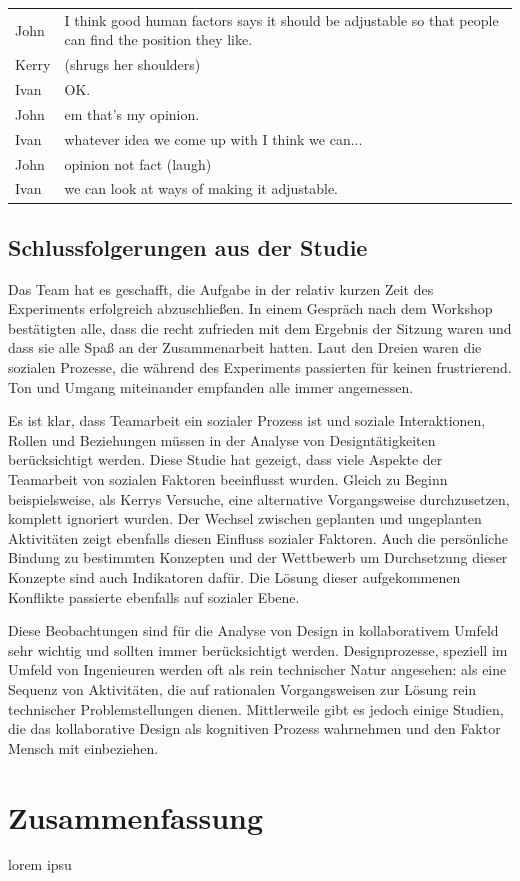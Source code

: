 \begin{extract}[Kerry und Ivan finden Johns Einwand nicht so gut.]
	{
		\myfloatalign
		\begin{tabularx}{\textwidth}{p{1cm}X}
    		John & I think good human factors says it should be adjustable so that people can find the position they like. \\
			Kerry & (shrugs her shoulders) \\
			Ivan & OK. \\
			John & em that's my opinion. \\
			Ivan & whatever idea we come up with I think we can...\\
			John & opinion not fact (laugh)\\
			Ivan & we can look at ways of making it adjustable.\\
		\end{tabularx}
	}
\end{extract} 

\subsection{Schlussfolgerungen aus der Studie}

Das Team hat es geschafft, die Aufgabe in der relativ kurzen Zeit des Experiments erfolgreich abzuschließen. In einem Gespräch nach dem Workshop bestätigten alle, dass die recht zufrieden mit dem Ergebnis der Sitzung waren und dass sie alle Spaß an der Zusammenarbeit hatten. Laut den Dreien waren die sozialen Prozesse, die während des Experiments passierten für keinen frustrierend. Ton und Umgang miteinander empfanden alle immer angemessen.

\medskip Es ist klar, dass Teamarbeit ein sozialer Prozess ist und soziale Interaktionen, Rollen und Beziehungen müssen in der Analyse von Designtätigkeiten berücksichtigt werden. Diese Studie hat gezeigt, dass viele Aspekte der Teamarbeit von sozialen Faktoren beeinflusst wurden. Gleich zu Beginn beispielsweise, als Kerrys Versuche, eine alternative Vorgangsweise durchzusetzen, komplett ignoriert wurden. Der Wechsel zwischen geplanten und ungeplanten Aktivitäten zeigt ebenfalls diesen Einfluss sozialer Faktoren. Auch die persönliche Bindung zu bestimmten Konzepten und der Wettbewerb um Durchsetzung dieser Konzepte sind auch Indikatoren dafür. Die Lösung dieser aufgekommenen Konflikte passierte ebenfalls auf sozialer Ebene.

\medskip Diese Beobachtungen sind für die Analyse von Design in kollaborativem Umfeld sehr wichtig und sollten immer berücksichtigt werden. Designprozesse, speziell im Umfeld von Ingenieuren werden oft als rein technischer Natur angesehen: als eine Sequenz von Aktivitäten, die auf rationalen Vorgangsweisen zur Lösung rein technischer Problemstellungen dienen. Mittlerweile gibt es jedoch einige Studien, die das kollaborative Design als kognitiven Prozess wahrnehmen und den Faktor Mensch mit einbeziehen. \citep{Cross:1995}

\section*{Zusammenfassung}
lorem ipsu




